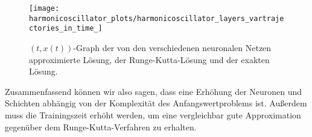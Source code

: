 \begin{figure}
       \centering
       \texttt{[image: harmonicoscillator\_plots/harmonicoscillator\_layers\_vartrajectories\_in\_time\_]}
       \caption{$(t,x(t))$-Graph der von den verschiedenen neuronalen Netzen approximierte Lösung, der
       Runge-Kutta-Lösung und der exakten Lösung.}
       \label{fig:harmonic-layers-variable-trajectories-in-time}
\end{figure}
Zusammenfassend können wir also sagen, dass eine Erhöhung der Neuronen und Schichten abhängig von der Komplexität des
Anfangswertproblems ist. Außerdem muss die Trainingszeit erhöht werden, um eine vergleichbar gute Approximation
gegenüber dem Runge-Kutta-Verfahren zu erhalten.
\newpage
